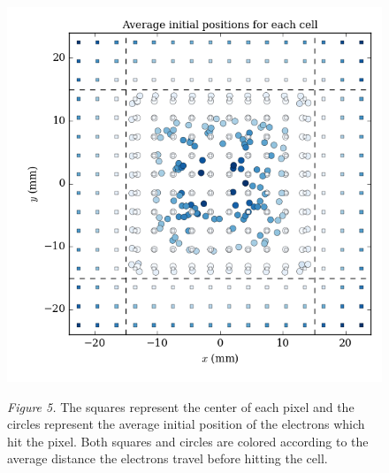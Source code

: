 \documentclass[12pt]{article}
\begin{document}
\begin{center}
\begin{figure}
\includegraphics[scale=0.9]{../figures/XY_stats.png}

\textit{Figure 5.} The squares represent the center of each pixel and the circles represent the average initial position of the electrons which hit the pixel. Both squares and circles are colored according to the average distance the electrons travel before hitting the cell.
\end{figure}
\end{center}
\end{document}
